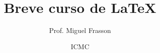 \documentclass{beamer}
\begin{document}
\title{Breve curso de \LaTeX{}}
\author[]{Prof. Miguel Frasson}
\date{ICMC}

\begin{frame}
  \titlepage
\end{frame}




%





% 









% 

% 


% 




\end{document}
